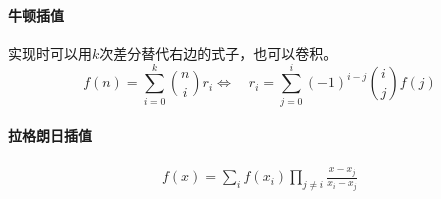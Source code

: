 \paragraph{牛顿插值} 
实现时可以用$k$次差分替代右边的式子，也可以卷积。
$$ f(n)=\sum_{i=0}^{k}{n\choose i}r_i \iff \quad r_i=\sum_{j=0}^i(-1)^{i-j}{i\choose j}f(j)$$
\paragraph{拉格朗日插值}
$$\begin{aligned}f(x) = \sum_i f(x_i)\prod_{j\ne i}\frac{x-x_j}{x_i-x_j}\end{aligned}$$
